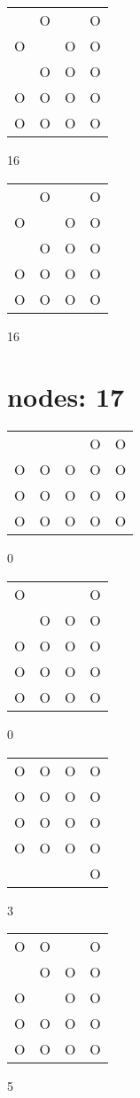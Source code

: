 \begin{tabular}{|m{0.2cm}m{0.2cm}m{0.2cm}m{0.2cm}|}\hline
 &O& &O\\
O& &O&O\\
 &O&O&O\\
O&O&O&O\\
O&O&O&O\\
\hline\end{tabular}16
\begin{tabular}{|m{0.2cm}m{0.2cm}m{0.2cm}m{0.2cm}|}\hline
 &O& &O\\
O& &O&O\\
 &O&O&O\\
O&O&O&O\\
O&O&O&O\\
\hline\end{tabular}16
\section{nodes: 17}
\begin{tabular}{|m{0.2cm}m{0.2cm}m{0.2cm}m{0.2cm}m{0.2cm}|}\hline
 & & &O&O\\
O&O&O&O&O\\
O&O&O&O&O\\
O&O&O&O&O\\
\hline\end{tabular}0
\begin{tabular}{|m{0.2cm}m{0.2cm}m{0.2cm}m{0.2cm}|}\hline
O& & &O\\
 &O&O&O\\
O&O&O&O\\
O&O&O&O\\
O&O&O&O\\
\hline\end{tabular}0
\begin{tabular}{|m{0.2cm}m{0.2cm}m{0.2cm}m{0.2cm}|}\hline
O&O&O&O\\
O&O&O&O\\
O&O&O&O\\
O&O&O&O\\
 & & &O\\
\hline\end{tabular}3
\begin{tabular}{|m{0.2cm}m{0.2cm}m{0.2cm}m{0.2cm}|}\hline
O&O& &O\\
 &O&O&O\\
O& &O&O\\
O&O&O&O\\
O&O&O&O\\
\hline\end{tabular}5
